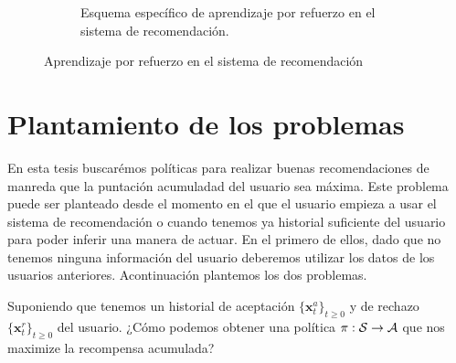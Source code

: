 \begin{figure}[]
\begin{subfigure}[b]{0.4\textwidth}
        \caption{Esquema específico de aprendizaje por refuerzo en el sistema de recomendación.}
        \label{sqmrs}
    \end{subfigure}
    \hspace{\fill}

    \caption{ Aprendizaje por refuerzo en el sistema de recomendación}
\end{figure}



\section{Plantamiento de los problemas}

En esta tesis buscarémos políticas para realizar buenas recomendaciones de manreda que la puntación acumuladad del usuario sea máxima. Este problema puede ser planteado desde el momento en el que el usuario empieza a usar el sistema de recomendación o cuando tenemos ya historial suficiente del usuario para poder inferir una manera de actuar. En el primero de ellos, dado que no tenemos ninguna información del usuario deberemos utilizar los datos de los usuarios anteriores. Acontinuación plantemos los dos problemas.


\begin{problem}\label{prob1}
    Suponiendo que tenemos un historial de aceptación $\{ \bm{x}_t^a\}_{t\geq 0}$ y de rechazo $\{ \bm{x}_t^r\}_{t\geq 0}$ del usuario. ¿Cómo podemos obtener una política $\pi: \mathcal{S} \rightarrow \mathcal{A} $ que nos maximize la recompensa acumulada?
\end{problem}


